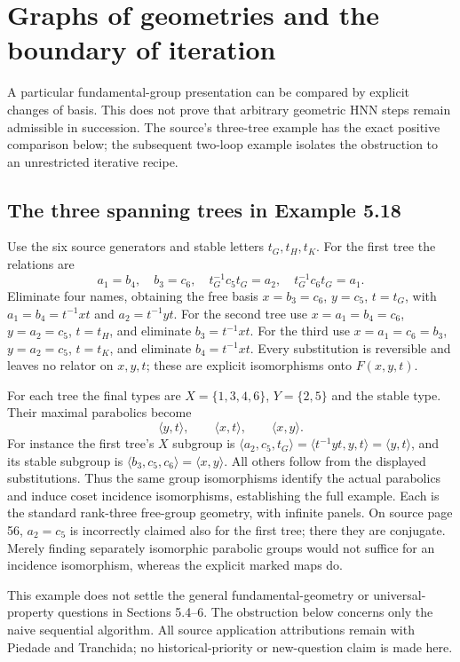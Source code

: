 \section{Graphs of geometries and the boundary of iteration}\label{sec:app-graphs}
A particular fundamental-group presentation can be compared by explicit changes of basis. This does not prove that arbitrary geometric HNN steps remain admissible in succession. The source's three-tree example has the exact positive comparison below; the subsequent two-loop example isolates the obstruction to an unrestricted iterative recipe.

\subsection{The three spanning trees in Example 5.18}
Use the six source generators and stable letters $t_G,t_H,t_K$.
For the first tree the relations are
\[
 a_1=b_4,\quad b_3=c_6,\quad t_G^{-1}c_5t_G=a_2,
 \quad t_G^{-1}c_6t_G=a_1.
\]
Eliminate four names, obtaining the free basis
$x=b_3=c_6$, $y=c_5$, $t=t_G$, with
$a_1=b_4=t^{-1}xt$ and $a_2=t^{-1}yt$.
For the second tree use $x=a_1=b_4=c_6$, $y=a_2=c_5$, $t=t_H$,
and eliminate $b_3=t^{-1}xt$. For the third use
$x=a_1=c_6=b_3$, $y=a_2=c_5$, $t=t_K$,
and eliminate $b_4=t^{-1}xt$.
Every substitution is reversible and leaves no relator on $x,y,t$;
these are explicit isomorphisms onto $F(x,y,t)$.

For each tree the final types are $X=\{1,3,4,6\}$,
$Y=\{2,5\}$ and the stable type. Their maximal parabolics become
\[
 \langle y,t\rangle,\qquad\langle x,t\rangle,\qquad\langle x,y\rangle.
\]
For instance the first tree's $X$ subgroup is
$\langle a_2,c_5,t_G\rangle=\langle t^{-1}yt,y,t\rangle
=\langle y,t\rangle$, and its stable subgroup is
$\langle b_3,c_5,c_6\rangle=\langle x,y\rangle$.
All others follow from the displayed substitutions. Thus the same
group isomorphisms identify the actual parabolics and induce coset
incidence isomorphisms, establishing the full example. Each is the
standard rank-three free-group geometry, with infinite panels.
On source page 56, $a_2=c_5$ is incorrectly claimed also for the
first tree; there they are conjugate. Merely finding separately
isomorphic parabolic groups would not suffice for an incidence
isomorphism, whereas the explicit marked maps do.

This example does not settle the general fundamental-geometry or
universal-property questions in Sections 5.4--6. The obstruction below concerns only the naive sequential algorithm. All source
application attributions remain with Piedade and Tranchida; no
historical-priority or new-question claim is made here.




